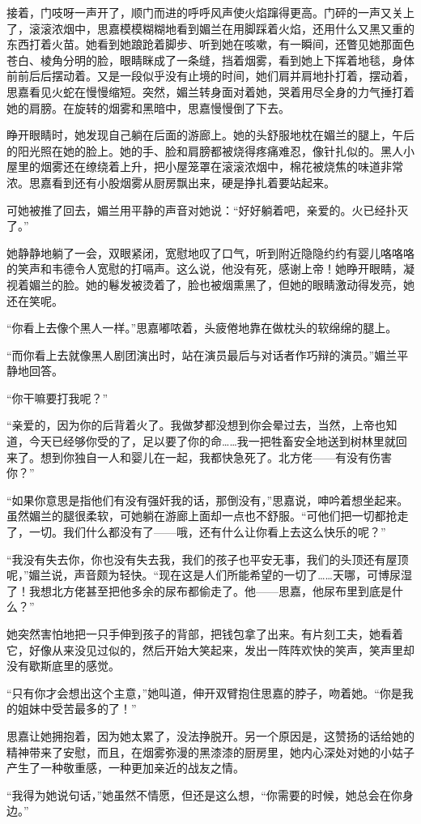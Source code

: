 \par 接着，门吱呀一声开了，顺门而进的呼呼风声使火焰蹿得更高。门砰的一声又关上了，滚滚浓烟中，思嘉模模糊糊地看到媚兰在用脚踩着火焰，还用什么又黑又重的东西打着火苗。她看到她踉跄着脚步、听到她在咳嗽，有一瞬间，还瞥见她那面色苍白、棱角分明的脸，眼睛眯成了一条缝，挡着烟雾，看到她上下挥着地毯，身体前前后后摆动着。又是一段似乎没有止境的时间，她们肩并肩地扑打着，摆动着，思嘉看见火蛇在慢慢缩短。突然，媚兰转身面对着她，哭着用尽全身的力气捶打着她的肩膀。在旋转的烟雾和黑暗中，思嘉慢慢倒了下去。
\par 睁开眼睛时，她发现自己躺在后面的游廊上。她的头舒服地枕在媚兰的腿上，午后的阳光照在她的脸上。她的手、脸和肩膀都被烧得疼痛难忍，像针扎似的。黑人小屋里的烟雾还在缭绕着上升，把小屋笼罩在滚滚浓烟中，棉花被烧焦的味道非常浓。思嘉看到还有小股烟雾从厨房飘出来，硬是挣扎着要站起来。
\par 可她被推了回去，媚兰用平静的声音对她说：“好好躺着吧，亲爱的。火已经扑灭了。”
\par 她静静地躺了一会，双眼紧闭，宽慰地叹了口气，听到附近隐隐约约有婴儿咯咯咯的笑声和韦德令人宽慰的打嗝声。这么说，他没有死，感谢上帝！她睁开眼睛，凝视着媚兰的脸。她的鬈发被烫着了，脸也被烟熏黑了，但她的眼睛激动得发亮，她还在笑呢。
\par “你看上去像个黑人一样。”思嘉嘟哝着，头疲倦地靠在做枕头的软绵绵的腿上。
\par “而你看上去就像黑人剧团演出时，站在演员最后与对话者作巧辩的演员。”媚兰平静地回答。
\par “你干嘛要打我呢？”
\par “亲爱的，因为你的后背着火了。我做梦都没想到你会晕过去，当然，上帝也知道，今天已经够你受的了，足以要了你的命……我一把牲畜安全地送到树林里就回来了。想到你独自一人和婴儿在一起，我都快急死了。北方佬——有没有伤害你？”
\par “如果你意思是指他们有没有强奸我的话，那倒没有，”思嘉说，呻吟着想坐起来。虽然媚兰的腿很柔软，可她躺在游廊上面却一点也不舒服。“可他们把一切都抢走了，一切。我们什么都没有了——哦，还有什么让你看上去这么快乐的呢？”
\par “我没有失去你，你也没有失去我，我们的孩子也平安无事，我们的头顶还有屋顶呢，”媚兰说，声音颇为轻快。“现在这是人们所能希望的一切了……天哪，可博尿湿了！我想北方佬甚至把他多余的尿布都偷走了。他——思嘉，他尿布里到底是什么？”
\par 她突然害怕地把一只手伸到孩子的背部，把钱包拿了出来。有片刻工夫，她看着它，好像从来没见过似的，然后开始大笑起来，发出一阵阵欢快的笑声，笑声里却没有歇斯底里的感觉。
\par “只有你才会想出这个主意，”她叫道，伸开双臂抱住思嘉的脖子，吻着她。“你是我的姐妹中受苦最多的了！”
\par 思嘉让她拥抱着，因为她太累了，没法挣脱开。另一个原因是，这赞扬的话给她的精神带来了安慰，而且，在烟雾弥漫的黑漆漆的厨房里，她内心深处对她的小姑子产生了一种敬重感，一种更加亲近的战友之情。
\par “我得为她说句话，”她虽然不情愿，但还是这么想，“你需要的时候，她总会在你身边。”

